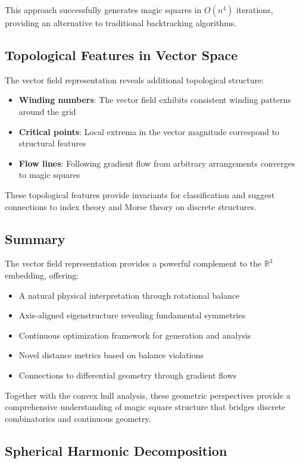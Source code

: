 This approach successfully generates magic squares in $O(n^4)$ iterations, providing an alternative to traditional backtracking algorithms.

\subsection{Topological Features in Vector Space}

The vector field representation reveals additional topological structure:

\begin{itemize}
    \item \textbf{Winding numbers}: The vector field exhibits consistent winding patterns around the grid
    \item \textbf{Critical points}: Local extrema in the vector magnitude correspond to structural features
    \item \textbf{Flow lines}: Following gradient flow from arbitrary arrangements converges to magic squares
\end{itemize}

These topological features provide invariants for classification and suggest connections to index theory and Morse theory on discrete structures.

\subsection{Summary}

The vector field representation provides a powerful complement to the $\mathbb{R}^3$ embedding, offering:
\begin{itemize}
    \item A natural physical interpretation through rotational balance
    \item Axis-aligned eigenstructure revealing fundamental symmetries
    \item Continuous optimization framework for generation and analysis
    \item Novel distance metrics based on balance violations
    \item Connections to differential geometry through gradient flows
\end{itemize}

Together with the convex hull analysis, these geometric perspectives provide a comprehensive understanding of magic square structure that bridges discrete combinatorics and continuous geometry.

\subsection{Spherical Harmonic Decomposition}\label{sec:spherical}

